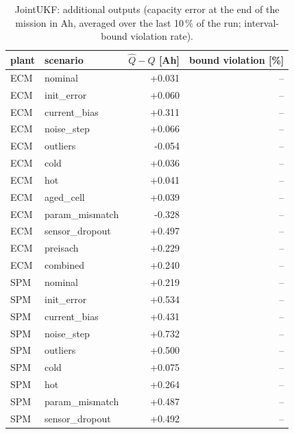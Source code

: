 \begin{table}[H]\centering\small\caption{JointUKF: additional outputs (capacity error at the end of the mission in Ah, averaged over the last 10\,\% of the run; interval-bound violation rate).}\label{tab:cellx_JointUKF}
\begin{tabular}{llrr}\toprule plant & scenario & $\hat Q - Q$ [Ah] & bound violation [\%] \\ \midrule
ECM & nominal & +0.031 & -- \\
ECM & init\_error & +0.060 & -- \\
ECM & current\_bias & +0.311 & -- \\
ECM & noise\_step & +0.066 & -- \\
ECM & outliers & -0.054 & -- \\
ECM & cold & +0.036 & -- \\
ECM & hot & +0.041 & -- \\
ECM & aged\_cell & +0.039 & -- \\
ECM & param\_mismatch & -0.328 & -- \\
ECM & sensor\_dropout & +0.497 & -- \\
ECM & preisach & +0.229 & -- \\
ECM & combined & +0.240 & -- \\
SPM & nominal & +0.219 & -- \\
SPM & init\_error & +0.534 & -- \\
SPM & current\_bias & +0.431 & -- \\
SPM & noise\_step & +0.732 & -- \\
SPM & outliers & +0.500 & -- \\
SPM & cold & +0.075 & -- \\
SPM & hot & +0.264 & -- \\
SPM & param\_mismatch & +0.487 & -- \\
SPM & sensor\_dropout & +0.492 & -- \\
\bottomrule\end{tabular}\end{table}
